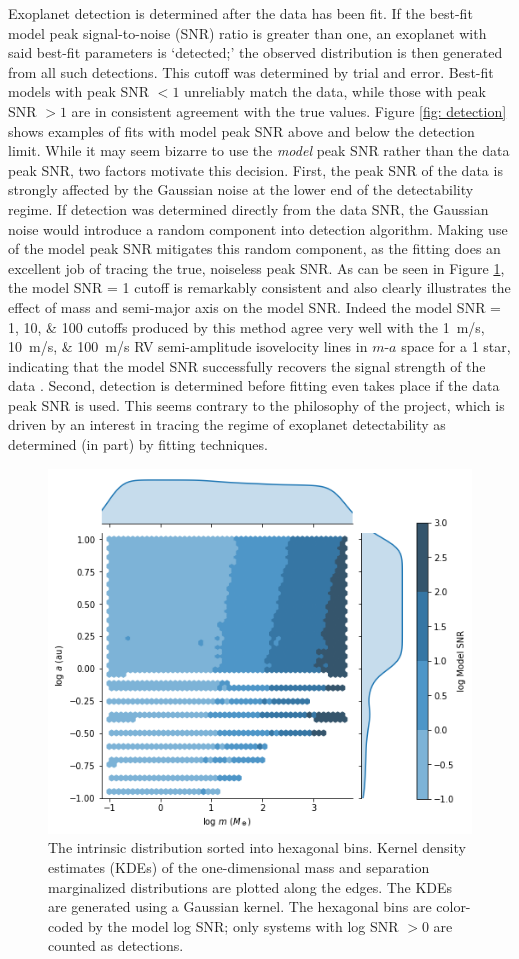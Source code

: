 \documentclass[12pt,manuscript]{aastex}
\begin{document}
Exoplanet detection is determined after the data has been fit. 
If the best-fit model peak signal-to-noise (SNR) ratio is greater than one, an exoplanet with said best-fit parameters is `detected;' the observed distribution is then generated from all such detections.
This cutoff was determined by trial and error. 
Best-fit models with peak SNR $< 1$ unreliably match the data, while those with peak SNR $> 1$ are in consistent agreement with the true values.
Figure \ref{fig: detection} shows examples of fits with model peak SNR above and below the detection limit.
While it may seem bizarre to use the \textit{model} peak SNR rather than the data peak SNR, two factors motivate this decision.
First, the peak SNR of the data is strongly affected by the Gaussian noise at the lower end of the detectability regime.
If detection was determined directly from the data SNR, the Gaussian noise would introduce a random component into detection algorithm.
Making use of the model peak SNR mitigates this random component, as the fitting does an excellent job of tracing the true, noiseless peak SNR.
As can be seen in Figure \ref{fig: 2d intrinsic}, the model SNR = 1 cutoff is remarkably consistent and also clearly illustrates the effect of mass and semi-major axis on the model SNR.
Indeed the model SNR = \numlist{1;10;100} cutoffs produced by this method agree very well with the \SIlist{1;10;100}{m/s} RV semi-amplitude isovelocity lines in $m$-$a$ space for a \SI{1}{\Msun} star, indicating that the model SNR successfully recovers the signal strength of the data \citep{ida&lin04}. 
Second, detection is determined before fitting even takes place if the data peak SNR is used.
This seems contrary to the philosophy of the project, which is driven by an interest in tracing the regime of exoplanet detectability as determined (in part) by fitting techniques.

\begin{figure}[ht]
  \centering
  \includegraphics[width=.7\linewidth]{../figures/planets3_intrinsic}
  \caption{The intrinsic distribution sorted into hexagonal bins. Kernel density estimates (KDEs) of the one-dimensional mass and separation marginalized distributions are plotted along the edges. The KDEs are generated using a Gaussian kernel. The hexagonal bins are color-coded by the model log SNR; only systems with log SNR $>0$ are counted as detections.}
  \label{fig: 2d intrinsic}
\end{figure}
\end{document}
